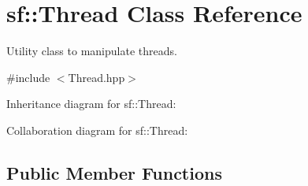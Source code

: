 \hypertarget{classsf_1_1_thread}{}\section{sf\+:\+:Thread Class Reference}
\label{classsf_1_1_thread}


Utility class to manipulate threads.  




{\ttfamily \#include $<$Thread.\+hpp$>$}



Inheritance diagram for sf\+:\+:Thread\+:


Collaboration diagram for sf\+:\+:Thread\+:
\subsection*{Public Member Functions}
